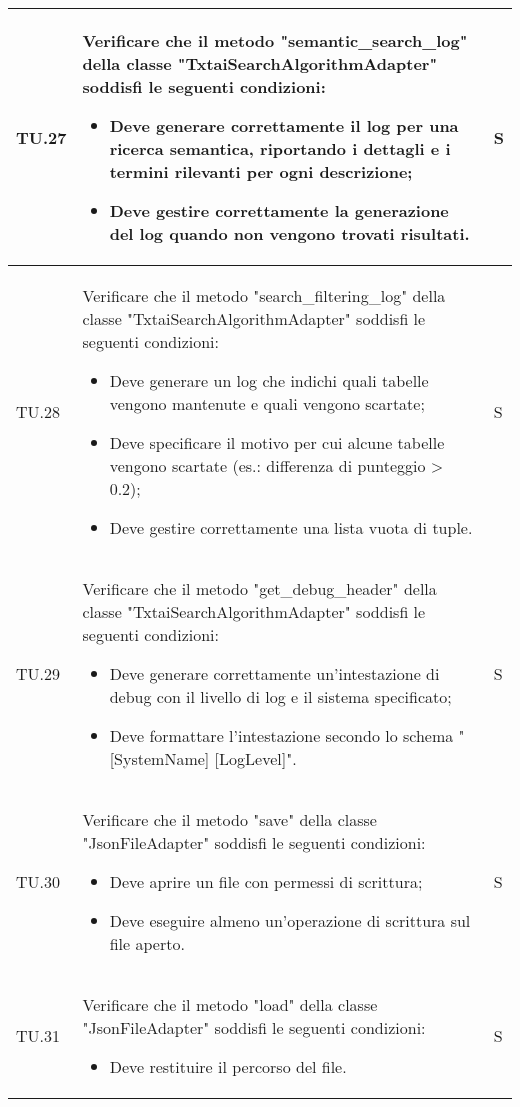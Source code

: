 \begin{adjustwidth}{-0.5cm}{-0.5cm}
\begin{longtable}{|P{1.5cm}|>{\raggedright}P{9.5cm}|>{\arraybackslash}P{1.5cm}|}
		\hline TU.27 & Verificare che il metodo "semantic\_search\_log" della classe "TxtaiSearchAlgorithmAdapter" soddisfi le seguenti condizioni:
		\begin{itemize}
			\item Deve generare correttamente il log per una ricerca semantica, riportando i dettagli e i termini rilevanti per ogni descrizione;
			\item Deve gestire correttamente la generazione del log quando non vengono trovati risultati.
		\end{itemize} & S \\

		\hline TU.28 & Verificare che il metodo "search\_filtering\_log" della classe "TxtaiSearchAlgorithmAdapter" soddisfi le seguenti condizioni:
		\begin{itemize}
			\item Deve generare un log che indichi quali tabelle vengono mantenute e quali vengono scartate;
			\item Deve specificare il motivo per cui alcune tabelle vengono scartate (es.: differenza di punteggio > 0.2);
   			\item Deve gestire correttamente una lista vuota di tuple.
		\end{itemize} & S \\

		\hline TU.29 & Verificare che il metodo "get\_debug\_header" della classe "TxtaiSearchAlgorithmAdapter" soddisfi le seguenti condizioni:
		\begin{itemize}
			\item Deve generare correttamente un'intestazione di debug con il livello di log e il sistema specificato;
			\item Deve formattare l'intestazione secondo lo schema "[SystemName] [LogLevel]".
		\end{itemize} & S \\

		\hline TU.30 & Verificare che il metodo "save" della classe "JsonFileAdapter" soddisfi le seguenti condizioni:
		\begin{itemize}
			\item Deve aprire un file con permessi di scrittura;
			\item Deve eseguire almeno un'operazione di scrittura sul file aperto.
		\end{itemize} & S \\

		\hline TU.31 & Verificare che il metodo "load" della classe "JsonFileAdapter" soddisfi le seguenti condizioni:
		\begin{itemize}
			\item Deve restituire il percorso del file.
		\end{itemize} & S \\


\end{longtable}
\end{adjustwidth}
